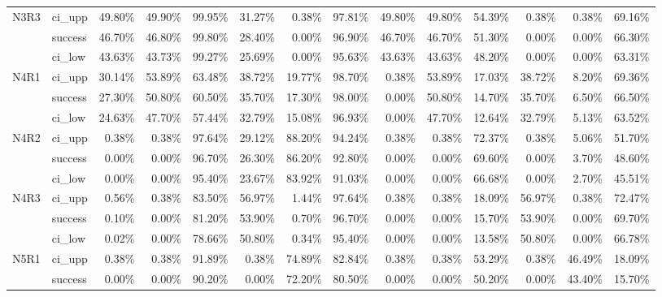 \begin{tabular}{llrrrrrrrrrrrr}
N3R3 & ci\_upp &      49.80\% & 49.90\% & 99.95\% & 31.27\% &  0.38\% & 97.81\% &       49.80\% & 49.80\% & 54.39\% &  0.38\% &  0.38\% & 69.16\% \\
     & success &      46.70\% & 46.80\% & 99.80\% & 28.40\% &  0.00\% & 96.90\% &       46.70\% & 46.70\% & 51.30\% &  0.00\% &  0.00\% & 66.30\% \\
     & ci\_low &      43.63\% & 43.73\% & 99.27\% & 25.69\% &  0.00\% & 95.63\% &       43.63\% & 43.63\% & 48.20\% &  0.00\% &  0.00\% & 63.31\% \\
N4R1 & ci\_upp &      30.14\% & 53.89\% & 63.48\% & 38.72\% & 19.77\% & 98.70\% &        0.38\% & 53.89\% & 17.03\% & 38.72\% &  8.20\% & 69.36\% \\
     & success &      27.30\% & 50.80\% & 60.50\% & 35.70\% & 17.30\% & 98.00\% &        0.00\% & 50.80\% & 14.70\% & 35.70\% &  6.50\% & 66.50\% \\
     & ci\_low &      24.63\% & 47.70\% & 57.44\% & 32.79\% & 15.08\% & 96.93\% &        0.00\% & 47.70\% & 12.64\% & 32.79\% &  5.13\% & 63.52\% \\
N4R2 & ci\_upp &       0.38\% &  0.38\% & 97.64\% & 29.12\% & 88.20\% & 94.24\% &        0.38\% &  0.38\% & 72.37\% &  0.38\% &  5.06\% & 51.70\% \\
     & success &       0.00\% &  0.00\% & 96.70\% & 26.30\% & 86.20\% & 92.80\% &        0.00\% &  0.00\% & 69.60\% &  0.00\% &  3.70\% & 48.60\% \\
     & ci\_low &       0.00\% &  0.00\% & 95.40\% & 23.67\% & 83.92\% & 91.03\% &        0.00\% &  0.00\% & 66.68\% &  0.00\% &  2.70\% & 45.51\% \\
N4R3 & ci\_upp &       0.56\% &  0.38\% & 83.50\% & 56.97\% &  1.44\% & 97.64\% &        0.38\% &  0.38\% & 18.09\% & 56.97\% &  0.38\% & 72.47\% \\
     & success &       0.10\% &  0.00\% & 81.20\% & 53.90\% &  0.70\% & 96.70\% &        0.00\% &  0.00\% & 15.70\% & 53.90\% &  0.00\% & 69.70\% \\
     & ci\_low &       0.02\% &  0.00\% & 78.66\% & 50.80\% &  0.34\% & 95.40\% &        0.00\% &  0.00\% & 13.58\% & 50.80\% &  0.00\% & 66.78\% \\
N5R1 & ci\_upp &       0.38\% &  0.38\% & 91.89\% &  0.38\% & 74.89\% & 82.84\% &        0.38\% &  0.38\% & 53.29\% &  0.38\% & 46.49\% & 18.09\% \\
     & success &       0.00\% &  0.00\% & 90.20\% &  0.00\% & 72.20\% & 80.50\% &        0.00\% &  0.00\% & 50.20\% &  0.00\% & 43.40\% & 15.70\% \\

\end{tabular}
